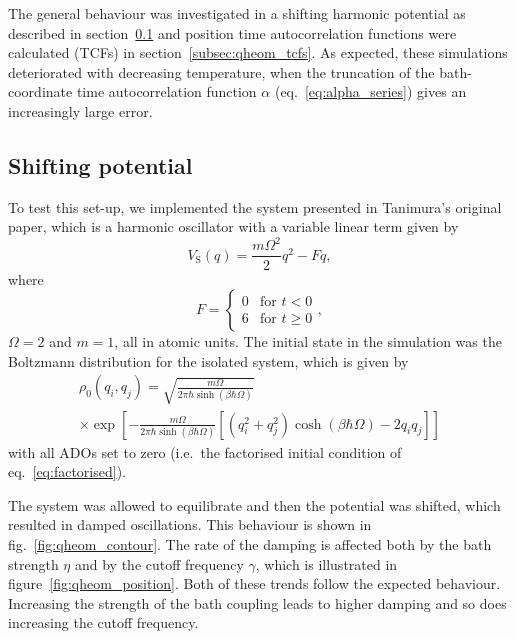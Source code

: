 The general behaviour was investigated in a shifting harmonic potential as described in section~\ref{subsec:qheom_shifting_potential} and position time autocorrelation functions were calculated (TCFs) in section~\ref{subsec:qheom_tcfs}. As expected, these simulations deteriorated with decreasing temperature, when the truncation of the bath-coordinate time autocorrelation function $\alpha$ (eq.~\ref{eq:alpha_series}) gives an increasingly large error.

\subsection{Shifting potential}\label{subsec:qheom_shifting_potential}
To test this set-up, we implemented the system presented in Tanimura's original paper,\supercite{Tanimura1991a} which is a harmonic oscillator with a variable linear term given by
\begin{equation}
	V_\mathrm{S}(q) = \frac{m \Omega^2}{2}q^2 - Fq,
\end{equation}
where
\begin{equation}
	F =
	\begin{cases}
	0 & \text{for }t<0 \\
	6 & \text{for }t\ge 0
	\end{cases},
\end{equation}
$\Omega=2$ and $m=1$, all in atomic units. The initial state in the simulation was the Boltzmann distribution for the isolated system, which is given by
\begin{multline}
	\rho_0 (q_i,q_j) = \sqrt{\frac{m\Omega}{2\pi \hbar \sinh(\beta\hbar\Omega)}}\\
	\times\exp\left[-\frac{m\Omega}{2\pi \hbar \sinh(\beta\hbar\Omega)} \left[(q_i^2+q_j^2)\cosh(\beta\hbar\Omega)-2 q_i q_j\right]\right]
	\label{eq:ho_init_state}
\end{multline}
with all ADOs set to zero (i.e.~the factorised initial condition of eq.~\ref{eq:factorised}).

The system was allowed to equilibrate and then the potential was shifted, which resulted in damped oscillations. This behaviour is shown in fig.~\ref{fig:qheom_contour}. The rate of the damping is affected both by the bath strength $\eta$ and by the cutoff frequency $\gamma$, which is illustrated in figure~\ref{fig:qheom_position}. Both of these trends follow the expected behaviour. Increasing the strength of the bath coupling leads to higher damping and so does increasing the cutoff frequency.

